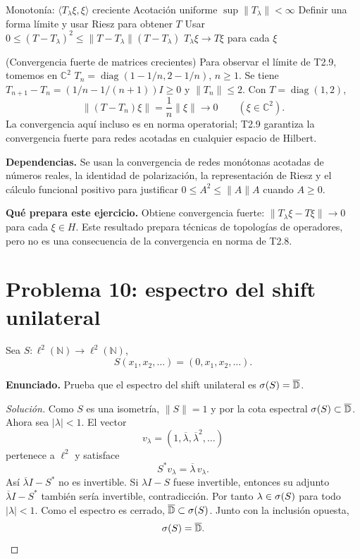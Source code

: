 \proofdiagrambranch
{Monotonía: $\langle T_\lambda\xi,\xi\rangle$ creciente}
{Acotación uniforme $\sup\|T_\lambda\|<\infty$}
{Definir una forma límite y usar Riesz para obtener $T$}
{Usar $0\le(T-T_\lambda)^2\le\|T-T_\lambda\|(T-T_\lambda)$}
{$T_\lambda\xi\to T\xi$ para cada $\xi$}

\begin{cthejemplo}{(Convergencia fuerte de matrices crecientes)}
Para observar el límite de T2.9, tomemos en $\mathbb C^2$
$T_n=\operatorname{diag}(1-1/n,2-1/n)$, $n\ge1$.
Se tiene $T_{n+1}-T_n=(1/n-1/(n+1))I\ge0$ y $\|T_n\|\le2$.
Con $T=\operatorname{diag}(1,2)$,
\[
 \|(T-T_n)\xi\|=\frac1n\|\xi\|\longrightarrow0
 \qquad(\xi\in\mathbb C^2).
\]
La convergencia aquí incluso es en norma operatorial; T2.9 garantiza la convergencia fuerte
para redes acotadas en cualquier espacio de Hilbert.
\end{cthejemplo}

\noindent\textbf{Dependencias.} Se usan la convergencia de redes monótonas acotadas de números reales, la identidad de polarización, la representación de Riesz y el cálculo funcional positivo para justificar $0\le A^2\le\|A\|A$ cuando $A\ge0$.

\noindent\textbf{Qué prepara este ejercicio.} Obtiene convergencia fuerte: $\|T_\lambda\xi-T\xi\|\to0$ para cada $\xi\in H$. Este resultado prepara técnicas de topologías de operadores, pero no es una consecuencia de la convergencia en norma de T2.8.

\section{Problema 10: espectro del shift unilateral}


Sea $S:\ell^2(\mathbb N)\to\ell^2(\mathbb N)$,
\[
S(x_1,x_2,\dots)=(0,x_1,x_2,\dots).
\]

\noindent\textbf{Enunciado.} Prueba que el espectro del shift unilateral es $\sigma(S)=\overline{\mathbb D}$.

\begin{proof}[Solución]
Como $S$ es una isometría, $\|S\|=1$ y por la cota espectral
$\sigma(S)\subset\overline{\mathbb D}$. Ahora sea $|\lambda|<1$. El vector
\[
 v_\lambda=(1,\overline\lambda,\overline\lambda^2,\ldots)
\]
pertenece a $\ell^2$ y satisface
\[
 S^*v_\lambda=\overline\lambda\,v_\lambda.
\]
Así $\overline\lambda I-S^*$ no es invertible. Si $\lambda I-S$ fuese invertible, entonces su
adjunto $\overline\lambda I-S^*$ también sería invertible, contradicción. Por tanto
$\lambda\in\sigma(S)$ para todo $|\lambda|<1$. Como el espectro es cerrado,
$\overline{\mathbb D}\subset\sigma(S)$. Junto con la inclusión opuesta,
\[
 \sigma(S)=\overline{\mathbb D}.
\]
\end{proof}

